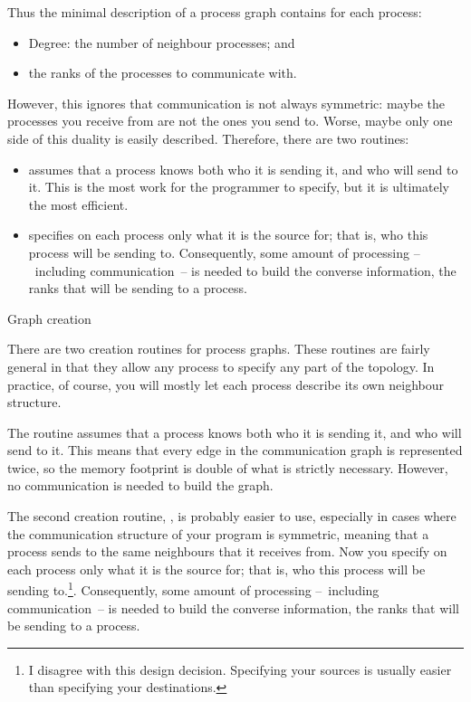 Thus the minimal description of a process graph contains for each process:
\begin{itemize}
\item Degree: the number of neighbour processes; and
\item the ranks of the processes to communicate with.
\end{itemize}
However, this ignores that communication is not always symmetric:
maybe the processes you receive from are not the ones you send
to. Worse, maybe only one side of this duality is easily
described. Therefore, there are two routines:
\begin{itemize}
\item {} assumes that a
  process knows both who it is sending it, and who will send to
  it. This is the most work for the programmer to specify, but it is
  ultimately the most efficient.
\item {} specifies on each process
  only what it is the source for; that is, who this process will be sending
  to. Consequently, some amount of processing
  --~including communication~-- is needed to build the converse
  information, the ranks that will be sending to a process.
\end{itemize}

 {Graph creation}

There are two creation routines for process graphs. These routines are
fairly general in that they allow any process to specify any part of
the topology. In practice, of course, you will mostly let each process
describe its own neighbour structure.

The routine  assumes that a process
knows both who it is sending it, and who will send to it. This means
that every edge in the communication graph is represented twice, so
the memory footprint is double of what is strictly necessary. However,
no communication is needed to build the graph.

The second creation routine, , is
probably easier to use, especially in cases where the communication
structure of your program is symmetric, meaning that a process sends
to the same neighbours that it receives from.  Now you specify on each
process only what it is the source for; that is, who this process will
be sending to.\footnote{I disagree with this design
  decision. Specifying your sources is usually easier than specifying
  your destinations.}. Consequently, some amount of processing
--~including communication~-- is needed to build the converse
information, the ranks that will be sending to a process.

